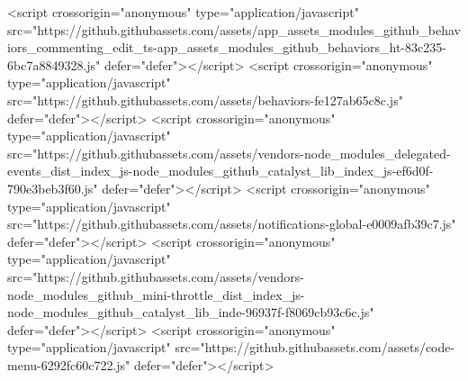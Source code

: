 <script crossorigin="anonymous" type="application/javascript" src="https://github.githubassets.com/assets/app_assets_modules_github_behaviors_commenting_edit_ts-app_assets_modules_github_behaviors_ht-83c235-6bc7a8849328.js" defer="defer"></script>
<script crossorigin="anonymous" type="application/javascript" src="https://github.githubassets.com/assets/behaviors-fe127ab65c8c.js" defer="defer"></script>
<script crossorigin="anonymous" type="application/javascript" src="https://github.githubassets.com/assets/vendors-node_modules_delegated-events_dist_index_js-node_modules_github_catalyst_lib_index_js-ef6d0f-790e3beb3f60.js" defer="defer"></script>
<script crossorigin="anonymous" type="application/javascript" src="https://github.githubassets.com/assets/notifications-global-e0009afb39c7.js" defer="defer"></script>
<script crossorigin="anonymous" type="application/javascript" src="https://github.githubassets.com/assets/vendors-node_modules_github_mini-throttle_dist_index_js-node_modules_github_catalyst_lib_inde-96937f-f8069cb93c6c.js" defer="defer"></script>
<script crossorigin="anonymous" type="application/javascript" src="https://github.githubassets.com/assets/code-menu-6292fc60c722.js" defer="defer"></script>
  
